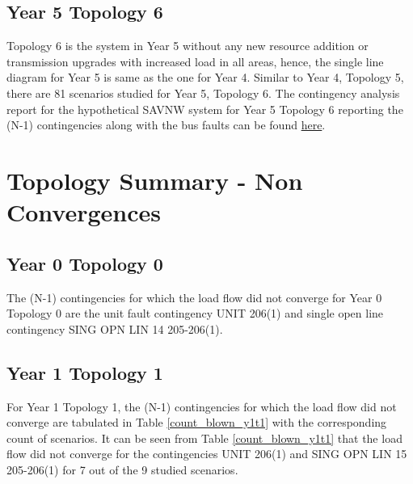 \documentclass[10pt]{report}
\begin{document}
\section{Year 5 Topology 6}

Topology 6 is the system in Year 5 without any new resource addition or transmission upgrades with increased load in all areas, hence, the single line diagram for Year 5 is same as the one for Year 4. Similar to Year 4, Topology 5, there are 81 scenarios studied for Year 5, Topology 6. 
The contingency analysis report for the hypothetical SAVNW system for Year 5 Topology 6 reporting the (N-1) contingencies along with the bus faults can be found \href{https://github.com/jessla89/PSSE-Contingency-Analysis/blob/main/pssecontingency_topology_6.pdf}{here}.


\chapter{Topology Summary - Non Convergences}
\label{chap:nonconv}

\section{Year 0 Topology 0}

The (N-1) contingencies for which the load flow did not converge for Year 0 Topology 0 are the unit fault contingency UNIT 206(1) and single open line contingency SING OPN LIN 14 205-206(1).

\section{Year 1 Topology 1}

For Year 1 Topology 1, the (N-1) contingencies for which the load flow did not converge are tabulated in Table \ref{count_blown_y1t1} with the corresponding count of scenarios. It can be seen from Table \ref{count_blown_y1t1} that the load flow did not converge for the contingencies UNIT 206(1) and SING OPN LIN   15 205-206(1) for 7 out of the 9 studied scenarios. 

\begin{table}[H]

\caption{Count of scenarios for which (N-1) contingencies failed to converge -  Year 1, Topology 1}
\label{count_blown_y1t1}
\centering
{}

\end{table}
\end{document}
